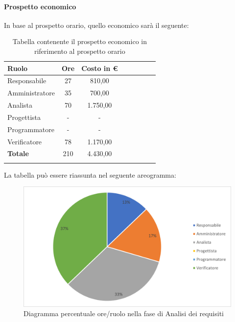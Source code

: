 \paragraph{Prospetto economico}
In base al prospetto orario, quello economico sarà il seguente:

\begin{longtable}{|l|c|c|c|c|c|c|c|}
	\hline
	\rowcolor{lighter-grayer}
	\textbf{Ruolo}  & \textbf{Ore} & \textbf{Costo in €} \\
	\hline
	\endfirsthead

	\hline
	Responsabile    & 27           & 810,00              \\
	\hline
	\hline
	Amministratore  & 35           & 700,00              \\
	\hline
	\hline
	Analista        & 70           & 1.750,00            \\
	\hline
	\hline
	Progettista     & -            & -                   \\
	\hline
	\hline
	Programmatore   & -            & -                   \\
	\hline
	\hline
	Verificatore    & 78           & 1.170,00            \\
	\hline
	\textbf{Totale} & 210          & 4.430,00            \\
	\hline
	\rowcolor{white}
	\caption{Tabella contenente il prospetto economico in riferimento al prospetto orario}
\end{longtable}
\pagebreak

La tabella può essere riassunta nel seguente areogramma:
\begin{figure}[H]
	\centering
	\includegraphics[width=0.8\linewidth]{res/images/preventivo/1-2.png}
	\caption{Diagramma percentuale ore/ruolo nella fase di Analisi dei requisiti}
	\label{fig:diagramma costi ruolo fase analisi dei requisiti}
\end{figure}

